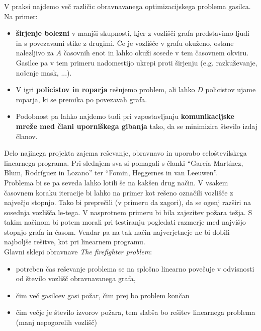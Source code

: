 \documentclass[a4paper, 12pt]{article}
\begin{document}
V praksi najdemo več različic obravnavanega optimizacijskega problema gasilca. Na primer:
\begin{itemize}
    \item\textbf{širjenje bolezni} v manjši skupnosti, kjer z vozlišči grafa predstavimo ljudi 
    in s povezavami stike z drugimi. Če je vozlišče v grafu okuženo, ostane nalezljivo 
    za $A$ časovnih enot in lahko okuži sosede v tem časovnem okviru. Gasilce pa v tem
    primeru nadomestijo ukrepi proti širjenju (e.g. razkuževanje, nošenje mask, ...).
    \item V igri \textbf{policistov in roparja} rešujemo problem, ali lahko $D$ policistov ujame roparja, ki se 
    premika po povezavah grafa. 
    \item Podobnost pa lahko najdemo tudi pri vzpostavljanju \textbf{komunikacijske mreže med člani uporniškega gibanja}
    tako, da se minimizira število izdaj članov.
\end{itemize}

\noindent Delo najinega projekta zajema reševanje, obravnavo in uporabo celoštevilskega linearnega programa. 
Pri slednjem sva si pomagali s članki ``García-Martínez, Blum, Rodríguez in Lozano''\cite{garcia2015} ter
``Fomin, Heggernes in van Leeuwen''\cite{fomin2015}. \\
Problema bi se pa seveda lahko lotili še
na kakšen drug način. V vsakem časovnem koraku iteracije bi lahko na primer kot rešeno označili vozlišče z 
največjo stopnjo. Tako bi preprečili (v primeru da zagori), da se ogenj razširi na sosednja vozlišča
le-tega. V nasprotnem primeru bi bila zajezitev požara težja. 
S takim načinom bi potem morali pri testiranju pogledati razmerje med najvišjo stopnjo 
grafa in časom. Vendar pa na tak način najverjetneje ne bi dobili najboljše
rešitve, kot pri linearnem programu. \\

\noindent Glavni sklepi obravnave \emph{The firefighter problem}:
\begin{itemize}
    \item potreben čas reševanje problema se na splošno linearno povečuje
            v odvisnosti od število vozlišč obravnavanega grafa,
    \item čim več gasilcev gasi požar, čim prej bo problem končan
    \item čim večje je število izvorov požara, tem slabša bo rešitev linearnega problema 
        (manj nepogorelih vozlišč)
\end{itemize}

\pagebreak
 



\end{document}
